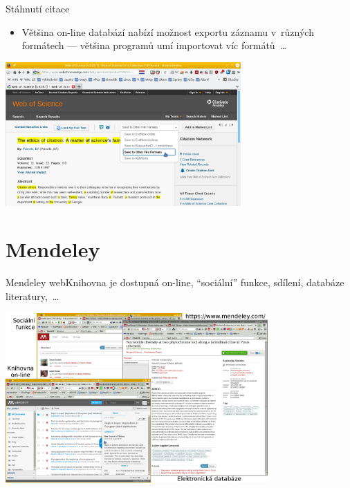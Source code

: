 \documentclass[compress, ucs, xelatex, 11pt, xcolor=svgnames, aspectratio=169,
	hyperref={
		bookmarks=true,
		unicode=true,
		colorlinks=true,
		pdftitle={Citacni software},
		plainpages=false,
		pdfauthor={Vojtech Zeisek},
		pdfsubject={Kratky uvod do citacniho software},
		pdfcreator={XeLaTeX},
		pdfkeywords={citace, reference, software, literatura},
		linkcolor=Crimson, %
		anchorcolor=Magenta, %
		citecolor=Magenta, %
		filecolor=Magenta, %
		menucolor=Magenta, %
		urlcolor=DarkTurquoise, %
		pdftex},
	url={hyphens, lowtilde} %
	]{beamer}
\begin{document}
\begin{frame}{Stáhnutí citace}
	\begin{itemize}
		\item Většina on-line databází nabízí možnost exportu záznamu v~různých formátech --- většina programů umí importovat víc formátů~\ldots
	\end{itemize}
	\begin{center}
		\includegraphics[height=5.5cm]{export_z_wos.png}
	\end{center}
\end{frame}

\section{Mendeley}

\begin{frame}{Mendeley web}{Knihovna je dostupná on-line, \enquote{sociální} funkce, sdílení, databáze literatury,~\ldots}
	\begin{center}
		\includegraphics[height=6.5cm]{mendeley_web.png}
	\end{center}
\end{frame}
\end{document}
